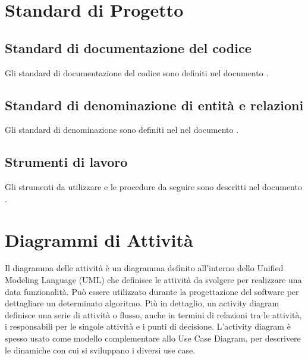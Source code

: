 \section{Standard di Progetto}

\subsection{Standard di documentazione del codice}
Gli standard di documentazione del codice sono definiti nel
documento  \emph{\normediprogetto} .

\subsection{Standard di denominazione di entità e relazioni }
Gli standard di denominazione sono definiti nel nel
documento  \emph{\normediprogetto} .

\subsection{Strumenti di lavoro}
Gli strumenti da utilizzare e le procedure da seguire sono descritti
nel documento  \emph{\normediprogetto} .


\section{Diagrammi di Attività}
Il diagramma delle attività è un diagramma definito all'interno dello
Unified Modeling Language (UML) che definisce le attività da svolgere
per realizzare una data funzionalità. Può essere utilizzato durante la
progettazione del software per dettagliare un determinato
algoritmo. Più in dettaglio, un activity diagram definisce una serie
di attività o flusso, anche in termini di relazioni tra le attività, i
responsabili per le singole attività e i punti di
decisione. L'activity diagram è spesso usato come modello
complementare allo Use Case Diagram, per descrivere le dinamiche con
cui si sviluppano i diversi use case. 

